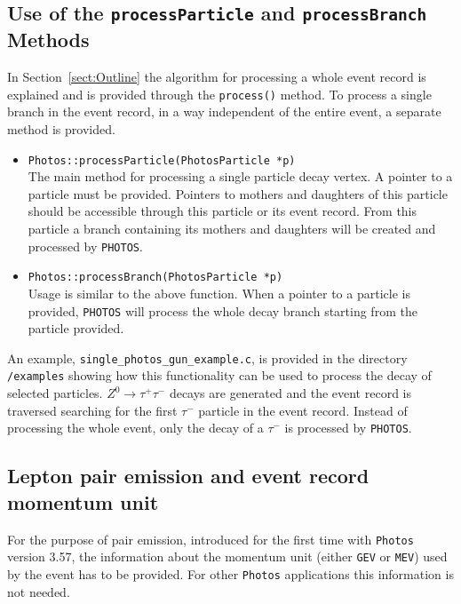 \documentclass[]{Photos_interface_design}
\begin{document}
\subsection{Use of the {\tt processParticle} and {\tt processBranch} Methods}
\label{PHOTOSgun}

In Section~\ref{sect:Outline} the algorithm for processing a whole
event record is explained and is provided through the {\tt process()}
method.  To process a single branch in the event record, in a way
independent of the entire event, a separate method is provided.

\begin{itemize}
  \item {\tt Photos::processParticle(PhotosParticle *p) } \hfill \\
		The main method for processing a single particle decay vertex. A pointer to a particle must
		be provided. Pointers to mothers and daughters of this particle should be
		accessible through this particle or its event record.
		From this particle a branch containing its mothers and daughters
		will be created and processed by {\tt PHOTOS}.
  \item {\tt Photos::processBranch(PhotosParticle *p) } \hfill \\
		Usage is similar to the above function. When a pointer to a particle is provided,
		{\tt PHOTOS} will process the whole decay branch starting from the particle provided.
\end{itemize}

An example, {\tt single\_photos\_gun\_example.c}, is provided in the directory {\tt /examples}
showing how this functionality can be used to process the decay of selected particles.
$Z^0 \rightarrow \tau^+ \tau^-$ decays are generated and the event record is traversed
searching for the first $\tau^-$ particle in the event record.
Instead of processing the whole event, only the decay of a $\tau^-$ is processed by {\tt PHOTOS}.

\subsection{Lepton pair emission and event record momentum unit}
\label{sec:units}



For the purpose of pair emission, introduced for the first time   with {\tt Photos} version
3.57, the information about the momentum unit
(either {\tt GEV} or {\tt MEV}) used by the event has to be provided.
For other {\tt Photos} applications this information is not needed.
\end{document}
